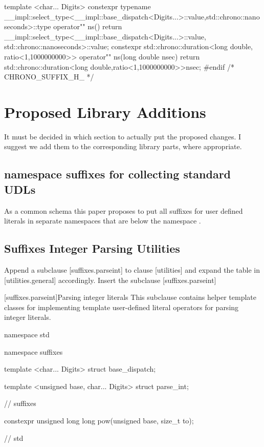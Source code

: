 \documentclass[ebook,11pt,article]{memoir}
\begin{document}
\begin{codeblock}
{{{template <char... Digits>
constexpr typename 
__impl::select_type<__impl::base_dispatch<Digits...>::value,std::chrono::nanoseconds>::type
operator"" ns(){
    return __impl::select_type<__impl::base_dispatch<Digits...>::value,
               std::chrono::nanoseconds>::value;
}
constexpr std::chrono::duration<long double, ratio<1,1000000000>> operator"" ns(long double nsec){
    return std::chrono::duration<long double,ratio<1,1000000000>>{nsec};
}
}
}
}
#endif /* CHRONO_SUFFIX_H_ */
\end{codeblock}



\chapter{Proposed Library Additions}
It must be decided in which section to actually put the proposed changes. I suggest we add them to the corresponding library parts, where appropriate.
\section{namespace suffixes for collecting standard UDLs}
As a common schema this paper proposes to put all suffixes for user defined literals in separate namespaces that are below the namespace . 

\section{Suffixes Integer Parsing Utilities}
Append a subclause [suffixes.parseint] to clause [utilities] and expand the table in [utilities.general] accordingly.
Insert the subclause [suffixes.parseint]

[suffixes.parseint]{Parsing integer literals}
\pnum
This subclause contains helper template classes for implementing template user-defined literal operators for parsing  integer literals.

\begin{codeblock}
namespace std {
namespace suffixes {

template <char... Digits>
struct base_dispatch;

template <unsigned base, char... Digits>
struct parse_int;

} // suffixes

constexpr unsigned long long
pow(unsigned base, size_t to);

} // std
\end{codeblock}
\end{document}
